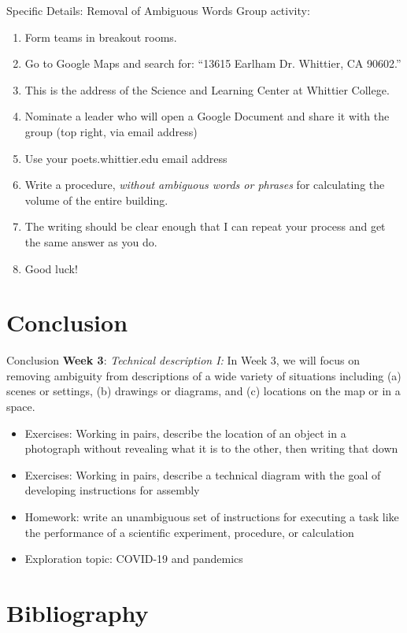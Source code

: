 \documentclass{beamer}
\begin{document}
\begin{frame}{Specific Details: Removal of Ambiguous Words}
\alert{Group activity}: \\ 
\begin{enumerate}
\item Form teams in breakout rooms.
\item Go to Google Maps and search for:  ``13615 Earlham Dr. Whittier, CA 90602.''
\item This is the address of the Science and Learning Center at Whittier College.
\item Nominate a leader who will open a Google Document and share it with the group (top right, via email address)
\item Use your poets.whittier.edu email address
\item Write a procedure, \textit{without ambiguous words or phrases} for calculating the volume of the entire building.
\item The writing should be clear enough that I can repeat your process and get the same answer as you do.
\item Good luck!
\end{enumerate}
\end{frame}

\section{Conclusion}

\begin{frame}{Conclusion}
\textbf{Week 3}: \textit{Technical description I:} In Week 3, we will focus on removing ambiguity from descriptions of a wide variety of situations including (a) scenes or settings, (b) drawings or diagrams, and (c) locations on the map or in a space.
\begin{itemize}
\item Exercises: Working in pairs, describe the location of an object in a photograph without revealing what it is to the other, then writing that down
\item Exercises: Working in pairs, describe a technical diagram with the goal of developing instructions for assembly
\item Homework: write an unambiguous set of instructions for executing a task like the performance of a scientific experiment, procedure, or calculation
\item Exploration topic: COVID-19 and pandemics
\end{itemize}
\end{frame}


\section{Bibliography}


\end{document}
